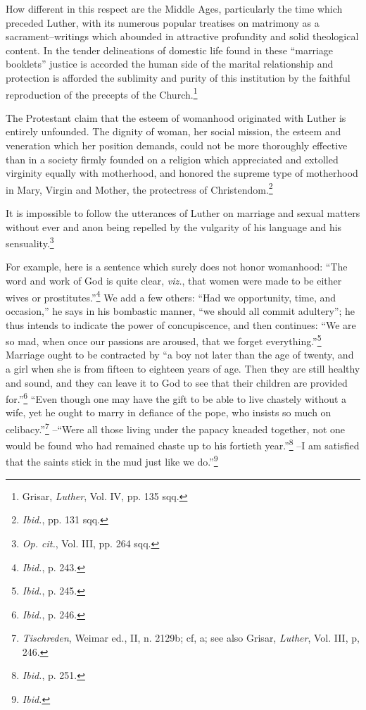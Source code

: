 How different in this respect are the Middle Ages, particularly the
time which preceded Luther, with its numerous popular treatises on
matrimony as a sacrament--writings which abounded in attractive
profundity and solid theological content. In the tender delineations of
domestic life found in these “marriage booklets” justice is accorded
the human side of the marital relationship and protection is afforded
the sublimity and purity of this institution by the faithful reproduction
of the precepts of the Church.\footnote{Grisar, \textit{Luther}, Vol. IV, pp. 135 sqq.}

The Protestant claim that the esteem of womanhood originated
with Luther is entirely unfounded. The dignity of woman, her social
mission, the esteem and veneration which her position demands, could
not be more thoroughly effective than in a society firmly founded
on a religion which appreciated and extolled virginity equally with
motherhood, and honored the supreme type of motherhood in Mary,
Virgin and Mother, the protectress of Christendom.\footnote{\textit{Ibid.}, pp. 131 sqq.}

It is impossible to follow the utterances of Luther on marriage and
sexual matters without ever and anon being repelled by the vulgarity
of his language and his sensuality.\footnote{\textit{Op. cit.}, Vol. III, pp. 264 sqq.}

For example, here is a sentence which surely does not honor womanhood:
“The word and work of God is quite clear, \textit{viz.}, that women were made to
be either wives or prostitutes.”\footnote{\textit{Ibid.}, p. 243.}
 We add a few others: “Had we opportunity,
time, and occasion,” he says in his bombastic manner, “we should all
commit adultery”; he thus intends to indicate the power of concupiscence,
and then continues: “We are so mad, when once our passions are aroused,
that we forget everything.”\footnote{\textit{Ibid.}, p. 245.}
 Marriage ought to be contracted by “a boy
not later than the age of twenty, and a girl when she is from fifteen to
eighteen years of age. Then they are still healthy and sound, and they can
leave it to God to see that their children are provided for.”\footnote{\textit{Ibid.}, p. 246.}
 “Even though
one may have the gift to be able to live chastely without a wife, yet he
ought to marry in defiance of the pope, who insists so much on celibacy.”\footnote{\textit{Tischreden}, Weimar ed., II, n. 2129b; cf, a; see also Grisar, \textit{Luther}, Vol. III, p, 246.}
--“Were all those living under the papacy kneaded together, not one
would be found who had remained chaste up to his fortieth year.”\footnote{\textit{Ibid.}, p. 251.}
--I am satisfied that the saints stick in the mud just like we do.”\footnote{\textit{Ibid.}}

